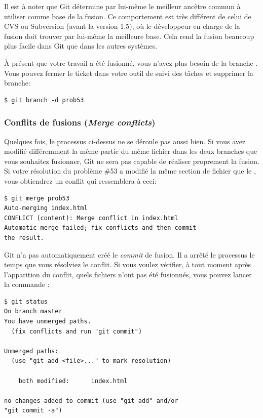 Il est à noter que Git détermine par lui-même le meilleur ancêtre commun à utiliser comme base de la fusion. Ce comportement est très différent de celui de CVS ou Subversion (avant la version 1.5), où le développeur en charge de la fusion doit trouver par lui-même la meilleure base.
Cela rend la fusion beaucoup plus facile dans Git que dans les autres systèmes.

À présent que votre travail a été fusionné, vous n'avez plus besoin de la branche .
Vous pouvez fermer le ticket dans votre outil de suivi des tâches et supprimer la branche:
\begin{Schunk}
\begin{Verbatim}
$ git branch -d prob53
\end{Verbatim}
\end{Schunk}

\subsubsection{Conflits de fusions (\emph{Merge conflicts})}
\label{sec:git:basic_merge_conflicts}

Quelques fois, le processus ci-dessus ne se déroule pas aussi bien.
Si vous avez modifié différemment la même partie du même fichier dans les deux branches que vous souhaitez fusionner, Git ne sera pas capable de réaliser proprement la fusion.
Si votre résolution du problème \#53 a modifié la même section de fichier que le , vous obtiendrez un conflit qui ressemblera à ceci:
\begin{Schunk}
\begin{Verbatim}
$ git merge prob53
Auto-merging index.html
CONFLICT (content): Merge conflict in index.html
Automatic merge failed; fix conflicts and then commit
the result.
\end{Verbatim}
\end{Schunk}

Git n'a pas automatiquement créé le \emph{commit} de fusion.
Il a arrêté le processus le temps que vous résolviez le conflit.
Si vous voulez vérifier, à tout moment après l'apparition du conflit, quels fichiers n'ont pas été fusionnés, vous pouvez lancer la commande :
\begin{Schunk}
\begin{Verbatim}
$ git status
On branch master
You have unmerged paths.
  (fix conflicts and run "git commit")

Unmerged paths:
  (use "git add <file>..." to mark resolution)

    both modified:      index.html

no changes added to commit (use "git add" and/or
"git commit -a")
\end{Verbatim}
\end{Schunk}

